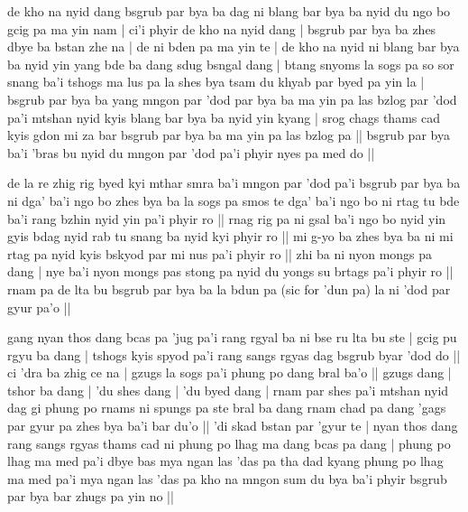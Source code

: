 \documentclass[11pt,twoside]{article}\makeatletter
\begin{document}
\label{TV3.2}de kho na nyid  dang bsgrub par bya ba dag ni blang bar bya ba nyid du ngo bo gcig pa ma yin nam | ci'i phyir de kho na nyid dang | bsgrub par bya ba zhes dbye ba bstan zhe na | de ni bden pa ma yin te | de kho na nyid ni blang bar bya ba nyid yin yang bde ba dang sdug bsngal dang | btang snyoms la sogs pa so sor snang ba'i tshogs ma lus pa la shes bya tsam du khyab par byed pa yin la | bsgrub par bya ba yang mngon par 'dod par bya ba ma yin pa las bzlog par 'dod pa'i mtshan nyid kyis blang bar bya ba nyid yin kyang | srog chags thams cad kyis gdon mi za bar bsgrub par bya ba ma yin pa las bzlog pa || bsgrub par bya ba'i 'bras bu nyid du mngon par 'dod pa'i phyir nyes pa med do ||
\par
\label{TV4.1}de la re zhig rig byed kyi mthar smra ba'i mngon par 'dod pa'i bsgrub par bya ba ni dga' ba'i ngo bo zhes bya ba la sogs pa smos te dga' ba'i ngo bo ni rtag tu bde ba'i rang bzhin nyid yin pa'i phyir ro || rnag rig pa ni gsal ba'i ngo bo nyid yin gyis bdag nyid rab tu snang ba nyid kyi phyir ro || mi g-yo ba zhes bya ba ni mi rtag pa nyid kyis bskyod par mi nus pa'i phyir ro || zhi ba ni nyon mongs pa dang | nye ba'i nyon mongs pas stong pa nyid du yongs su brtags pa'i phyir ro || rnam pa de lta bu bsgrub par bya ba la bdun pa (sic for 'dun pa) la ni 'dod par gyur pa'o || \par
\label{TV4.2}gang nyan thos dang bcas pa 'jug pa'i rang rgyal ba ni bse ru lta bu ste | gcig pu rgyu ba dang | tshogs kyis spyod pa'i rang sangs rgyas dag bsgrub byar 'dod do || ci 'dra ba zhig ce na | gzugs la sogs pa'i phung po dang bral ba'o || gzugs dang | tshor ba dang | 'du shes dang | 'du byed dang | rnam par shes pa'i mtshan nyid dag gi phung po rnams ni spungs pa ste bral ba dang rnam chad pa dang 'gags par gyur pa zhes bya ba'i bar du'o || 'di skad bstan par 'gyur te | nyan thos dang rang sangs rgyas thams cad ni phung po lhag ma dang bcas pa dang | phung po lhag ma med pa'i dbye bas mya ngan las 'das pa tha dad kyang phung po lhag ma med pa'i mya ngan las 'das pa kho na mngon sum du bya ba'i phyir bsgrub par bya bar zhugs pa yin no || 
\par
\end{document}
